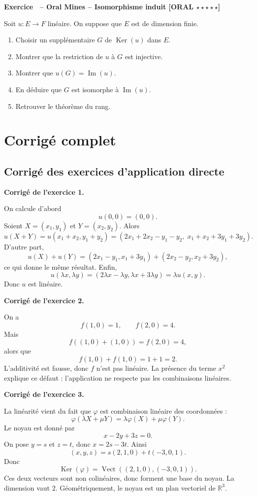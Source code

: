 \documentclass[11pt,a4paper]{article}
\newcounter{exo}
\newcommand{\exo}[3]{
    \refstepcounter{exo}
    \vspace{0.5cm}
    \noindent
    \colorbox{gray!15}{
    \parbox{0.965\linewidth}{
    \textbf{Exercice \theexo\ -- #1 \hfill [#2 \; #3]}
    }}
    \vspace{0.15cm}
}
\newcommand{\corr}[1]{
    \vspace{0.4cm}
    \noindent\textbf{\textcolor{blue!60!black}{Corrigé de l'exercice #1.}}
    \par\vspace{0.1cm}
}
\newcommand{\Ker}{\operatorname{Ker}}
\newcommand{\Img}{\operatorname{Im}}
\newcommand{\Vect}{\operatorname{Vect}}
\begin{document}
\exo{Oral Mines -- Isomorphisme induit}{ORAL}{$\star\star\star\star\star$}

Soit $u:E\to F$ linéaire. On suppose que $E$ est de dimension finie.
\begin{enumerate}
    \item Choisir un supplémentaire $G$ de $\Ker(u)$ dans $E$.
    \item Montrer que la restriction de $u$ à $G$ est injective.
    \item Montrer que $u(G)=\Img(u)$.
    \item En déduire que $G$ est isomorphe à $\Img(u)$.
    \item Retrouver le théorème du rang.
\end{enumerate}

\newpage

\section{Corrigé complet}

\subsection{Corrigé des exercices d'application directe}

\corr{1}
On calcule d'abord
\[
u(0,0)=(0,0).
\]
Soient $X=(x_1,y_1)$ et $Y=(x_2,y_2)$. Alors
\[
u(X+Y)=u(x_1+x_2,y_1+y_2)
=(2x_1+2x_2-y_1-y_2,\;x_1+x_2+3y_1+3y_2).
\]
D'autre part,
\[
u(X)+u(Y)=(2x_1-y_1,x_1+3y_1)+(2x_2-y_2,x_2+3y_2),
\]
ce qui donne le même résultat. Enfin,
\[
u(\lambda x,\lambda y)=(2\lambda x-\lambda y,\lambda x+3\lambda y)=\lambda u(x,y).
\]
Donc $u$ est linéaire.

\corr{2}
On a
\[
f(1,0)=1,\qquad f(2,0)=4.
\]
Mais
\[
f((1,0)+(1,0))=f(2,0)=4,
\]
alors que
\[
f(1,0)+f(1,0)=1+1=2.
\]
L'additivité est fausse, donc $f$ n'est pas linéaire. La présence du terme $x^2$ explique ce défaut : l'application ne respecte pas les combinaisons linéaires.

\corr{3}
La linéarité vient du fait que $\varphi$ est combinaison linéaire des coordonnées :
\[
\varphi(\lambda X+\mu Y)=\lambda\varphi(X)+\mu\varphi(Y).
\]
Le noyau est donné par
\[
x-2y+3z=0.
\]
On pose $y=s$ et $z=t$, donc $x=2s-3t$. Ainsi
\[
(x,y,z)=s(2,1,0)+t(-3,0,1).
\]
Donc
\[
\Ker(\varphi)=\Vect((2,1,0),(-3,0,1)).
\]
Ces deux vecteurs sont non colinéaires, donc forment une base du noyau. La dimension vaut $2$. Géométriquement, le noyau est un plan vectoriel de $\mathbb{R}^3$.
\end{document}
